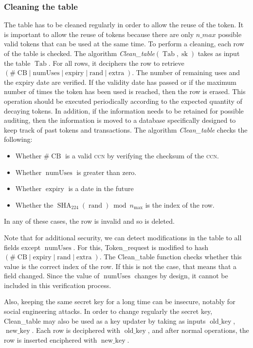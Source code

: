 \documentclass{llncs}
\DeclareMathOperator{\numUses}{numUses}
\DeclareMathOperator{\Tab}{Tab}
\DeclareMathOperator{\CB}{CB}
\DeclareMathOperator{\expiry}{expiry}
\DeclareMathOperator{\extra}{extra}
\DeclareMathOperator{\rand}{rand}
\DeclareMathOperator{\oldkey}{old\_key}
\DeclareMathOperator{\newkey}{new\_key}
\DeclareMathOperator{\sk}{sk}
\DeclareMathOperator{\SHA}{SHA}
\begin{document}
\subsubsection{Cleaning the table}
The table has to be cleaned regularly in order to allow the reuse of the token. It is important to allow the reuse of tokens because there are only $n\_{max}$ possible valid tokens that can be used at the same time. To perform a cleaning, each row of the table is checked. The algorithm \textit{Clean\_table}$(\Tab,\sk)$ takes as input the table $\Tab$. For all rows, it deciphers the row to retrieve $(\#\CB | \numUses | \expiry | \rand | \extra)$. The number of remaining uses and the expiry date are verified. If the validity date has passed or if the maximum number of times the token has been used is reached, then the row is erased. This operation should be executed periodically according to the expected quantity of decaying tokens. In addition, if the information needs to be retained for possible auditing, then the information is moved to a database specifically designed to keep track of past tokens and transactions. The algorithm \textit{Clean\_table} checks the following:
\begin{itemize}
    \item Whether $\#\CB$ is a valid \textsc{ccn} by verifying the checksum of the \textsc{ccn}.
    \item Whether $\numUses$ is greater than zero.
    \item Whether $\expiry$ is a date in the future
    \item Whether the $\SHA_{224}(\rand)\bmod n_{\max}$ is the index of the row.
\end{itemize}
In any of these cases, the row is invalid and so is deleted.

Note that for additional security, we can detect modifications in the table to all fields except $\numUses$. For this, Token\_request is modified to hash $(\#\CB | \expiry | \rand | \extra)$. The Clean\_table function checks whether this value is the correct index of the row. If this is not the case, that means that a field changed. Since the value of $\numUses$ changes by design, it cannot be included in this verification process.

Also, keeping the same secret key for a long time can be insecure, notably for social engineering attacks. In order to change regularly the secret key, Clean\_table may also be used as a key updater by taking as inputs $\oldkey$, $\newkey$. Each row is deciphered with $\oldkey$, and after normal operations, the row is inserted enciphered with $\newkey$.
\end{document}
